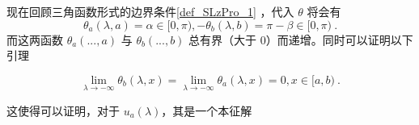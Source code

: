 现在回顾三角函数形式的边界条件\autoref{def_SLzPro_1} ，代入 $\theta$ 将会有
\begin{equation}
\theta_a(\lambda, a) = \alpha\in [0, \pi), -\theta_b(\lambda,  b) = \pi-\beta \in [0,\pi) ~.
\end{equation}
而这两函数 $\theta_a(..., a)$ 与 $\theta_b(..., b)$ 总有界（大于 $0$）而递增。同时可以证明以下引理
\begin{lemma}{}
\begin{equation}
\lim_{\lambda \rightarrow -\infty} \theta_b(\lambda, x) = \lim_{\lambda \rightarrow -\infty} \theta_a(\lambda, x) = 0, x \in [a, b) ~.
\end{equation}

\end{lemma}
这使得可以证明，对于 $u_a(\lambda)$，其是一个本征解